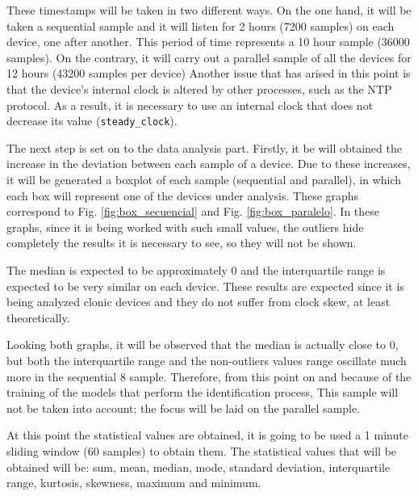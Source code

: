 These timestamps will be taken in two different ways. On the one hand, it will be taken a sequential sample and it will listen for 2 hours (7200 samples) on each device, one after another. This period of time represents a 10 hour sample (36000 samples). On the contrary, it will carry out a parallel sample of all the devices for 12 hours (43200 samples per device) Another issue that has arised in this point is that the device's internal clock is altered by other processes, such as the NTP protocol. As a result, it is necessary to use an internal clock that does not decrease its value (\texttt{steady\_clock}). 


The next step is set on to the data analysis part. Firstly, it be will obtained the increase in the deviation between each sample of a device. Due to these increases, it will be generated a boxplot of each sample (sequential and parallel), in which each box will represent one of the devices under analysis. These graphs correspond to Fig. \ref{fig:box_secuencial} and Fig. \ref{fig:box_paralelo}. In these graphs, since it is being worked with such small values, the outliers hide completely the results it is necessary to see, so they will not be shown. 


The median is expected to be approximately 0 and the interquartile range is expected to be very similar on each device. These results are expected since it is being analyzed clonic devices and they do not suffer from clock skew, at least theoretically.


Looking both graphs, it will be observed that the median is actually close to 0, but both the interquartile range and the non-outliers values range oscillate much more in the sequential 8 sample. Therefore, from this point on and because of the training of the models that perform the identification process, This sample will not be taken into account; the focus will be laid on the parallel sample. 


At this point the statistical values are obtained, it is going to be used a 1 minute sliding window (60 samples) to obtain them. The statistical values that will be obtained will be: sum, mean, median, mode, standard deviation, interquartile range, kurtosis, skewness, maximum and minimum.


